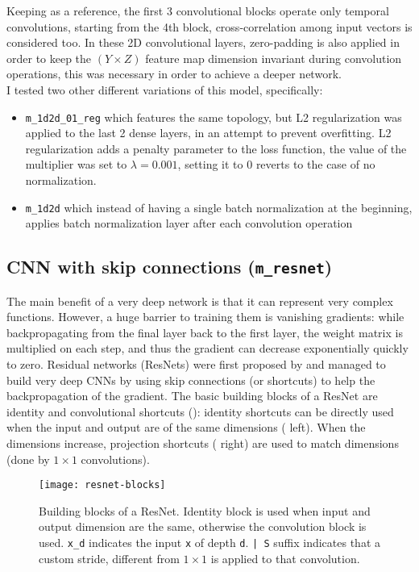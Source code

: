 Keeping  as a reference, the first 3 convolutional blocks operate only temporal convolutions, starting from the 4th block, \mbox{cross-correlation} among input vectors is considered too. In these 2D convolutional layers, \mbox{zero-padding} is also applied in order to keep the $(Y \times Z)$ feature map dimension invariant during convolution operations, this was necessary in order to achieve a deeper network.\\

I tested two other different variations of this model, specifically:
\begin{itemize}
\item \texttt{m_1d2d_01_reg} which features the same topology, but L2 regularization was applied to the last 2 dense layers, in an attempt to prevent overfitting. L2 regularization adds a penalty parameter to the loss function, the value of the multiplier was set to $\lambda=0.001$, setting it to 0 reverts to the case of no normalization.
\item \texttt{m_1d2d} which instead of having a single batch normalization at the beginning, applies batch normalization layer after each convolution operation
\end{itemize}

\subsection{CNN with skip connections (\texttt{m_resnet})}
\label{sec:m_resnet}
The main benefit of a very deep network is that it can represent very complex functions. However, a huge barrier to training them is vanishing gradients: while backpropagating from the final layer back to the first layer, the weight matrix is multiplied on each step, and thus the gradient can decrease exponentially quickly to zero. Residual networks (ResNets) were first proposed by \cite{resnets-2015} and managed to build very deep CNNs by using skip connections (or shortcuts) to help the backpropagation of the gradient.
The basic building blocks of a ResNet are identity and convolutional shortcuts (): identity shortcuts can be directly used when the input and output are of the same dimensions ( left). When the dimensions increase, projection shortcuts ( right) are used to match dimensions (done by $1 \times 1$ convolutions). \\

\begin{figure}[h]
	\captionsetup{font=scriptsize, justification=centering}
    \centering
	\texttt{[image: resnet-blocks]}
    \caption{Building blocks of a ResNet. Identity block is used when input and output dimension are the same, otherwise the convolution block is used. \texttt{x_d} indicates the input \texttt{x} of depth \texttt{d}. \texttt{| S} suffix indicates that a custom stride, different from $1 \times 1$ is applied to that convolution.}
    \label{fig:img_resnet}
\end{figure}

